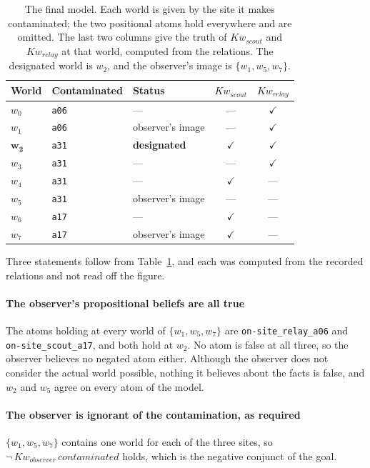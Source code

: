 \documentclass[11pt,a4paper]{article}
\theoremstyle{definition}
\newcommand{\Kw}[1]{\mathit{Kw}_{#1}}
\newcommand{\code}[1]{\texttt{\small #1}}
\newcommand{\site}[1]{\code{#1}}
\begin{document}
\begin{table}[H]
\centering\small
\caption{The final model. Each world is given by the site it makes
contaminated; the two positional atoms hold everywhere and are omitted. The
last two columns give the truth of $\Kw{\mathit{scout}}$ and
$\Kw{\mathit{relay}}$ at that world, computed from the relations. The
designated world is $w_2$, and the observer's image is
$\{w_1, w_5, w_7\}$.}
\label{tab:final}
\begin{tabular}{@{}lllcc@{}}
\toprule
\textbf{World} & \textbf{Contaminated} & \textbf{Status} &
$\Kw{\mathit{scout}}$ & $\Kw{\mathit{relay}}$ \\
\midrule
$w_0$ & \site{a06} & --- & --- & $\checkmark$ \\
$w_1$ & \site{a06} & observer's image & --- & $\checkmark$ \\
$\mathbf{w_2}$ & \site{a31} & \textbf{designated} & $\checkmark$ & $\checkmark$ \\
$w_3$ & \site{a31} & --- & --- & $\checkmark$ \\
$w_4$ & \site{a31} & --- & $\checkmark$ & --- \\
$w_5$ & \site{a31} & observer's image & --- & --- \\
$w_6$ & \site{a17} & --- & $\checkmark$ & --- \\
$w_7$ & \site{a17} & observer's image & $\checkmark$ & --- \\
\bottomrule
\end{tabular}
\end{table}

Three statements follow from Table~\ref{tab:final}, and each was computed from
the recorded relations and not read off the figure.

\paragraph{The observer's propositional beliefs are all true} The atoms holding
at every world of $\{w_1, w_5, w_7\}$ are \code{on-site\_relay\_a06} and
\code{on-site\_scout\_a17}, and both hold at $w_2$. No atom is false at all
three, so the observer believes no negated atom either. Although the observer
does not consider the actual world possible, nothing it believes about the
facts is false, and $w_2$ and $w_5$ agree on every atom of the model.

\paragraph{The observer is ignorant of the contamination, as required}
$\{w_1, w_5, w_7\}$ contains one world for each of the three sites, so
$\neg\,\Kw{\mathit{observer}}\,\mathit{contaminated}$ holds, which is the
negative conjunct of the goal.
\end{document}
